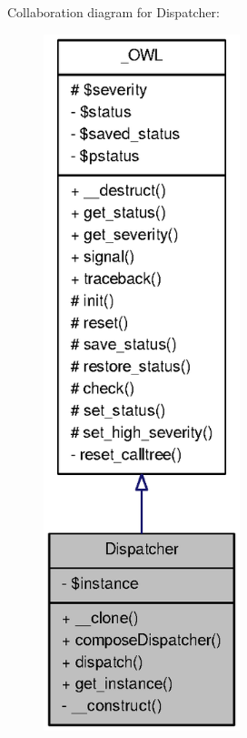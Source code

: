 Collaboration diagram for Dispatcher:\nopagebreak
\begin{figure}[H]
\begin{center}
\leavevmode
\includegraphics[width=162pt]{classDispatcher__coll__graph}
\end{center}
\end{figure}
